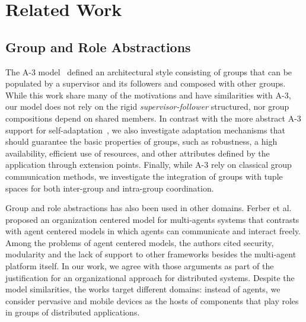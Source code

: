 \section{Related Work}\label{sec:related_work}


\subsection{Group and Role Abstractions}

The A-3 model~\cite{Baresi:2011:2} defined an architectural style consisting of groups that can be populated by a supervisor and its followers and composed with other groups. While this work share many of the motivations and have similarities with A-3, our model does not rely on the rigid \textit{supervisor-follower} structured, nor group compositions depend on shared members.
In contrast with the more abstract A-3 support for self-adaptation~\cite{Baresi:2011:2}, we also investigate adaptation mechanisms that should guarantee the basic properties of groups, such as robustness, a high availability, efficient use of resources, and other attributes defined by the application through extension points. Finally, while A-3 rely on classical group communication methods, we investigate the integration of groups with tuple spaces for both inter-group and intra-group coordination.

Group and role abstractions has also been used in other domains. Ferber et al.~\cite{Ferber:2004} proposed an organization centered model for multi-agents systems that contrasts with agent centered models in which agents can communicate and interact freely. Among the problems of agent centered models, the authors cited security, modularity and the lack of support to other frameworks besides the multi-agent platform itself. In our work, we agree with those arguments as part of the justification for an organizational approach for distributed systems. Despite the model similarities, the works target different domains: instead of agents, we consider pervasive and mobile devices as the hosts of components that play roles in groups of distributed applications. %

 
